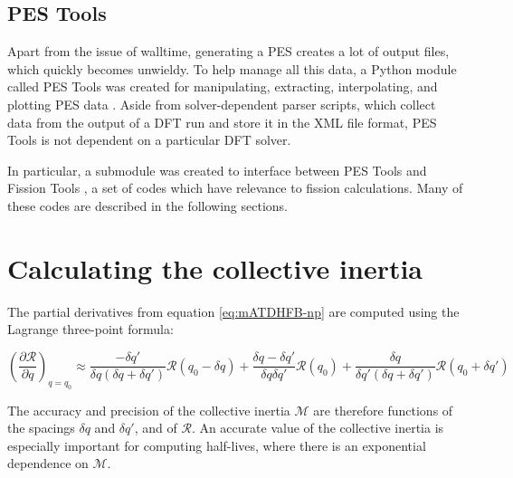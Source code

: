 
\subsection{PES Tools}
Apart from the issue of walltime, generating a PES creates a lot of output files, which quickly becomes unwieldy. To help manage all this data, a Python module called PES Tools was created for manipulating, extracting, interpolating, and plotting PES data \cite{PES_tools}. Aside from solver-dependent parser scripts, which collect data from the output of a DFT run and store it in the XML file format, PES Tools is not dependent on a particular DFT solver.

In particular, a submodule was created to interface between PES Tools and Fission Tools \cite{fission_tools}, a set of codes which have relevance to fission calculations. Many of these codes are described in the following sections.

\section{Calculating the collective inertia}\label{sect:M_numerical}
The partial derivatives from equation \ref{eq:mATDHFB-np} are computed using the Lagrange three-point formula:

\begin{equation}\label{eq:finite-diffs}
\left(\frac{\partial \mathcal{R}}{\partial q}\right)_{q=q_0} \approx 
    \frac{-\delta q'}{\delta q \left(\delta q + \delta q'\right)}\mathcal{R}(q_0-\delta q) + 
    \frac{\delta q - \delta q'}{\delta q \delta q'}\mathcal{R}(q_0) + 
    \frac{\delta q}{\delta q' \left(\delta q + \delta q'\right)}\mathcal{R}(q_0+\delta q')
\end{equation}

The accuracy and precision of the collective inertia $\mathcal{M}$ are therefore functions of the spacings $\delta q$ and $\delta q'$, and of $\mathcal{R}$. An accurate value of the collective inertia is especially important for computing half-lives, where there is an exponential dependence on $\mathcal{M}$.

